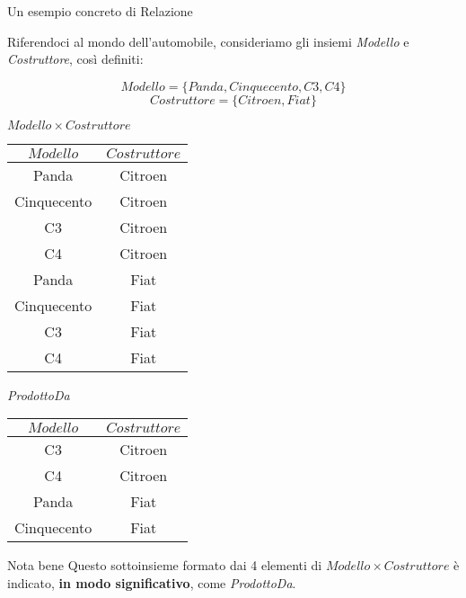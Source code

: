 \begin{frame}{Un esempio concreto di Relazione}
\begin{minipage}{0.9\textwidth}
    Riferendoci al mondo dell'automobile, consideriamo gli insiemi \textit{Modello} e \textit{Costruttore}, cos\`i definiti:
\end{minipage}
\vspace{-.3cm}
\pause
\[ Modello = \{Panda, Cinquecento, C3, C4\}\]
\[ Costruttore = \{Citroen, Fiat\} \]
\begin{minipage}[t]{0.48\linewidth}
\pause
    \begin{center}
        $Modello \times Costruttore$
        
        \pause
        \begin{tabular}{|c|c|}
            \hline
            \rowcolor{cyan!30}$Modello$ & $Costruttore$ \\
            \hline
            Panda & Citroen \\ \hline
            Cinquecento & Citroen \\ \hline
            C3 & Citroen \\ \hline
            C4 & Citroen \\ \hline
            Panda & Fiat \\ \hline
            Cinquecento & Fiat \\ \hline
            C3 & Fiat \\ \hline
            C4 & Fiat \\ \hline
        \end{tabular}
    \end{center}
\end{minipage}%
\hfill%
\begin{minipage}[t]{0.48\linewidth}
    \begin{center}
        \pause
        \textit{ProdottoDa}

        \pause
        \begin{tabular}{|c|c|}
            \hline
            \rowcolor{cyan!30}$Modello$ & $Costruttore$ \\
            \hline
            C3 & Citroen \\ \hline
            C4 & Citroen \\ \hline
            Panda & Fiat \\ \hline
            Cinquecento & Fiat \\ \hline
        \end{tabular}
    \end{center}
\pause
\vspace{-.55cm}
\begin{block}{Nota bene}
    {\small Questo sottoinsieme formato dai 4 elementi di $Modello \times Costruttore$ \`e indicato, \textbf{in modo significativo}, come \textit{ProdottoDa}.}
\end{block}
\end{minipage}
\end{frame}
